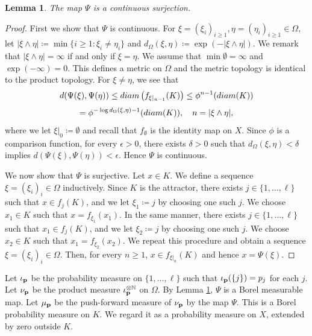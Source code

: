 \documentclass[10pt,a4paper]{amsart}
\newtheorem{Lem}[Thm]{Lemma}
\begin{document}
\begin{Lem}\label{lem:conti-surj}
The map $\Psi$ is a continuous surjection. 
\end{Lem}

\begin{proof}
First we show that $\Psi$ is continuous. 
For $\xi = (\xi_i)_{i \ge 1}, \eta = (\eta_i)_{i \ge 1} \in \Omega$, 
let $|\xi \wedge \eta| \coloneqq \min\{i \ge 1 \colon \xi_i \ne \eta_i\}$ and $d_{\Omega} (\xi, \eta) \coloneqq \exp(-|\xi \wedge \eta|)$. 
We remark that $|\xi \wedge \eta| = \infty$ if and only if $\xi = \eta$. 
We assume that $\min \emptyset = \infty$ and $\exp(-\infty) = 0$. 
This defines a metric on $\Omega$ and the metric topology is identical to the product topology. 
For $\xi \ne \eta$, we see that 
\[ d(\Psi(\xi), \Psi(\eta)) \le \textup{diam}\left(f_{\xi|_{n-1}} (K) \right) \le \phi^{n -1}(\textup{diam}(K)) \]
\[ = \phi^{-\log d_{\Omega}(\xi, \eta) -1}(\textup{diam}(K)), \quad n = |\xi \wedge \eta|,  \]
where we let $\xi|_0 \coloneqq \emptyset$ and recall that $f_{\emptyset}$ is the identity map on $X$. 
Since $\phi$ is a comparison function, 
for every $\epsilon > 0$, there exists $\delta > 0$ such that $d_{\Omega}(\xi, \eta) < \delta$ implies $d(\Psi(\xi), \Psi(\eta)) < \epsilon$. 
Hence $\Psi$ is continuous. 

We now show that $\Psi$ is surjective. 
Let $x \in K$. 
We define a sequence $\xi = (\xi_i)_i \in \Omega$ inductively. 
Since $K$ is the attractor, there exists $j  \in \{1, \dots, \ell\}$ such that $x \in f_{j} (K)$, and we let $\xi_1 \coloneqq j$ by choosing one such $j$. 
We choose $x_1 \in K$ such that $x = f_{\xi_1} (x_1)$. 
In the same manner, there exists $j \in \{1, \dots, \ell\}$ such that $x_1 \in f_{j} (K)$, and we let $\xi_2 \coloneqq j$ by choosing one such $j$. 
We choose $x_2 \in K$ such that $x_1 = f_{\xi_2} (x_2)$. 
We repeat this procedure and obtain a sequence $\xi = (\xi_i)_i \in \Omega$. 
 Then, for every $n \ge 1$, $x \in f_{\xi|_{n}} (K)$ and hence $x = \Psi(\xi)$. 
\end{proof}

Let $\iota_{\bf p}$ be the probability measure on $\{1,\dots, \ell\}$ such that $\iota_{\bf p} (\{j\}) = p_j$ for each $j$. 
Let $\nu_{\bf p}$ be the product measure $\iota_{\bf p}^{\otimes \mathbb N}$ on $\Omega$. 
By Lemma \ref{lem:conti-surj}, $\Psi$ is a Borel measurable map. 
Let $\mu_{\bf p}$ be the push-forward measure of $\nu_{\bf p}$ by the map $\Psi$.  
This is a Borel probability measure on $K$. 
We regard it as a probability measure on $X$, extended by zero outside $K$. 
\end{document}

